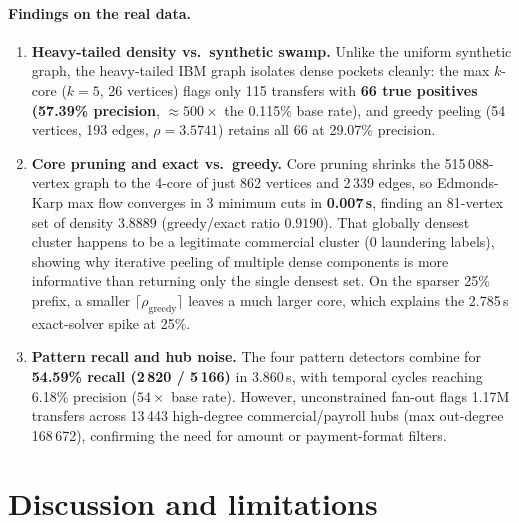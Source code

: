 \documentclass[11pt,a4paper]{article}
\theoremstyle{definition}
\begin{document}
\paragraph{Findings on the real data.}
\begin{enumerate}[leftmargin=1.5em]
\item \textbf{Heavy-tailed density vs.\ synthetic swamp.} Unlike the uniform synthetic graph, the heavy-tailed IBM graph isolates dense pockets cleanly: the max $k$-core ($k = 5$, 26 vertices) flags only 115 transfers with \textbf{66 true positives (57.39\% precision}, $\approx 500\times$ the 0.115\% base rate), and greedy peeling (54 vertices, 193 edges, $\rho = 3.5741$) retains all 66 at 29.07\% precision.
\item \textbf{Core pruning and exact vs.\ greedy.} Core pruning shrinks the 515\,088-vertex graph to the 4-core of just 862 vertices and 2\,339 edges, so Edmonds-Karp max flow converges in 3 minimum cuts in \textbf{0.007\,s}, finding an 81-vertex set of density $3.8889$ (greedy/exact ratio $0.9190$). That globally densest cluster happens to be a legitimate commercial cluster ($0$ laundering labels), showing why iterative peeling of multiple dense components is more informative than returning only the single densest set. On the sparser 25\% prefix, a smaller $\lceil \rho_{\text{greedy}} \rceil$ leaves a much larger core, which explains the 2.785\,s exact-solver spike at 25\%.
\item \textbf{Pattern recall and hub noise.} The four pattern detectors combine for \textbf{54.59\% recall (2\,820 / 5\,166)} in 3.860\,s, with temporal cycles reaching 6.18\% precision ($54\times$ base rate). However, unconstrained fan-out flags 1.17M transfers across 13\,443 high-degree commercial/payroll hubs (max out-degree 168\,672), confirming the need for amount or payment-format filters.
\end{enumerate}

\section{Discussion and limitations}
\end{document}
